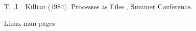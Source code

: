 \documentclass[twoside,twocolumn]{article}
\begin{document}
\begin{thebibliography}{99} %

T.~J.~ Killian (1984).
\newblock Processes as Files
, Summer Conference.

Linux man pages

\end{thebibliography}

\end{document}
